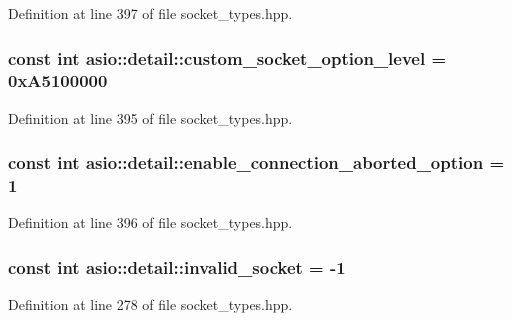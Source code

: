 Definition at line 397 of file socket\+\_\+types.\+hpp.

\hypertarget{namespaceasio_1_1detail_ac87c0ec12e7071c1f18513b04a627a24}{}
\subsubsection[{custom\+\_\+socket\+\_\+option\+\_\+level}]{\setlength{\rightskip}{0pt plus 5cm}const int asio\+::detail\+::custom\+\_\+socket\+\_\+option\+\_\+level = 0x\+A5100000}\label{namespaceasio_1_1detail_ac87c0ec12e7071c1f18513b04a627a24}


Definition at line 395 of file socket\+\_\+types.\+hpp.

\hypertarget{namespaceasio_1_1detail_a4d541df87cf6415ae4d57937476bb361}{}
\subsubsection[{enable\+\_\+connection\+\_\+aborted\+\_\+option}]{\setlength{\rightskip}{0pt plus 5cm}const int asio\+::detail\+::enable\+\_\+connection\+\_\+aborted\+\_\+option = 1}\label{namespaceasio_1_1detail_a4d541df87cf6415ae4d57937476bb361}


Definition at line 396 of file socket\+\_\+types.\+hpp.

\hypertarget{namespaceasio_1_1detail_acb107bcaaeb6ee70f25604a6da8fd0b3}{}
\subsubsection[{invalid\+\_\+socket}]{\setlength{\rightskip}{0pt plus 5cm}const int asio\+::detail\+::invalid\+\_\+socket = -\/1}\label{namespaceasio_1_1detail_acb107bcaaeb6ee70f25604a6da8fd0b3}


Definition at line 278 of file socket\+\_\+types.\+hpp.

\hypertarget{namespaceasio_1_1detail_ac51ba8a0b2cbbab69d47430bb1f61b14}{}
